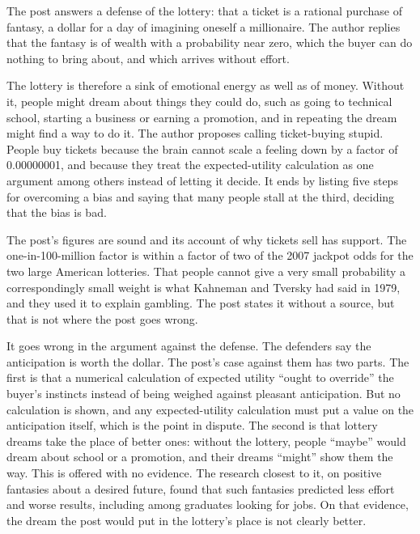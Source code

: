 \begin{afterword}
\summaryhead

The post answers a defense of the lottery: that a ticket is a rational purchase of fantasy, a dollar for a day of imagining oneself a millionaire. The author replies that the fantasy is of wealth with a probability near zero, which the buyer can do nothing to bring about, and which arrives without effort.

The lottery is therefore a sink of emotional energy as well as of money. Without it, people might dream about things they could do, such as going to technical school, starting a business or earning a promotion, and in repeating the dream might find a way to do it. The author proposes calling ticket-buying stupid. People buy tickets because the brain cannot scale a feeling down by a factor of 0.00000001, and because they treat the expected-utility calculation as one argument among others instead of letting it decide. It ends by listing five steps for overcoming a bias and saying that many people stall at the third, deciding that the bias is bad.

\responsehead

The post's figures are sound and its account of why tickets sell has support. The one-in-100-million factor is within a factor of two of the 2007 jackpot odds for the two large American lotteries. That people cannot give a very small probability a correspondingly small weight is what Kahneman and Tversky had said in 1979, and they used it to explain gambling. The post states it without a source, but that is not where the post goes wrong.

It goes wrong in the argument against the defense. The defenders say the anticipation is worth the dollar. The post's case against them has two parts. The first is that a numerical calculation of expected utility ``ought to override'' the buyer's instincts instead of being weighed against pleasant anticipation. But no calculation is shown, and any expected-utility calculation must put a value on the anticipation itself, which is the point in dispute. The second is that lottery dreams take the place of better ones: without the lottery, people ``maybe'' would dream about school or a promotion, and their dreams ``might'' show them the way. This is offered with no evidence. The research closest to it, on positive fantasies about a desired future, found that such fantasies predicted less effort and worse results, including among graduates looking for jobs. On that evidence, the dream the post would put in the lottery's place is not clearly better.


\end{afterword}
